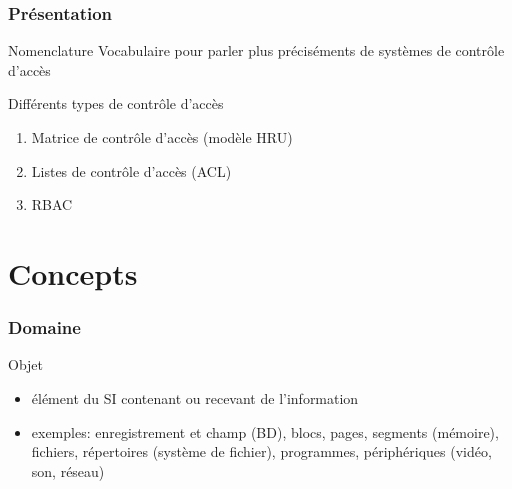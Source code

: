


  
\usepackage{ifthen}


\def\txthl#1{ \ifthenelse{\lengthtest{#1 pt<0.5pt}}{\top}{\bot} }



\begin{reveals}
		
\maketitle


\begin{frame}
  \frametitle{Présentation}

  \vfill

  \begin{block}{Nomenclature}
    Vocabulaire pour parler plus préciséments de systèmes de contrôle d'accès
  \end{block}

  \vfill

  \begin{block}{Différents types de contrôle d'accès}
    \begin{enumerate}
    \item Matrice de contrôle d'accès (modèle HRU)
    \item Listes de contrôle d'accès (ACL)
    \item RBAC
    \end{enumerate}
  \end{block}

  \vfill


\end{frame}

\section{Concepts}

\begin{frame}
  \frametitle{Domaine}

  \vfill

   \begin{block}{Objet}
     \begin{itemize}
     \item élément du SI contenant ou recevant de l'information
     \item exemples: enregistrement et champ (BD), blocs, pages,
       segments (mémoire), fichiers, répertoires (système de fichier),
       programmes, périphériques (vidéo, son, réseau)
     \end{itemize}
  \end{block}


\end{frame}
\end{reveals}
